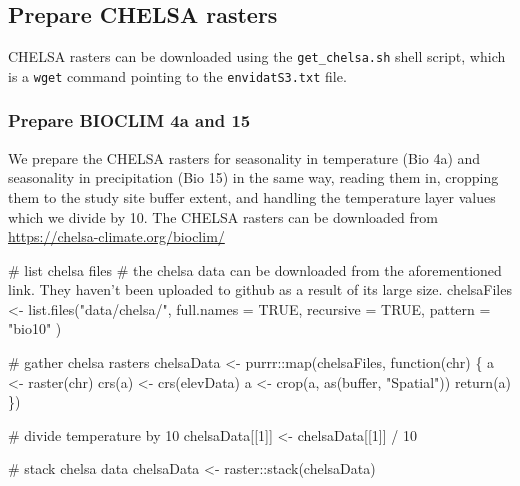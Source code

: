 \documentclass[
]{article}
\newenvironment{Shaded}{}{}
\newcommand{\CommentTok}[1]{\textcolor[rgb]{0.00,0.50,0.00}{#1}}
\newcommand{\ControlFlowTok}[1]{\textcolor[rgb]{0.00,0.00,1.00}{#1}}
\newcommand{\DataTypeTok}[1]{#1}
\newcommand{\DecValTok}[1]{#1}
\newcommand{\KeywordTok}[1]{\textcolor[rgb]{0.00,0.00,1.00}{#1}}
\newcommand{\NormalTok}[1]{#1}
\newcommand{\OperatorTok}[1]{#1}
\newcommand{\OtherTok}[1]{\textcolor[rgb]{1.00,0.25,0.00}{#1}}
\newcommand{\StringTok}[1]{\textcolor[rgb]{0.00,0.50,0.50}{#1}}
\begin{document}
\hypertarget{prepare-chelsa-rasters}{%
\subsection{Prepare CHELSA rasters}\label{prepare-chelsa-rasters}}

CHELSA rasters can be downloaded using the \texttt{get\_chelsa.sh} shell script, which is a \texttt{wget} command pointing to the \texttt{envidatS3.txt} file.

\hypertarget{prepare-bioclim-4a-and-15}{%
\subsubsection{Prepare BIOCLIM 4a and 15}\label{prepare-bioclim-4a-and-15}}

We prepare the CHELSA rasters for seasonality in temperature (Bio 4a) and seasonality in precipitation (Bio 15) in the same way, reading them in, cropping them to the study site buffer extent, and handling the temperature layer values which we divide by 10. The CHELSA rasters can be downloaded from \url{https://chelsa-climate.org/bioclim/}

\begin{Shaded}
\begin{Highlighting}[]
\CommentTok{# list chelsa files}
\CommentTok{# the chelsa data can be downloaded from the aforementioned link. They haven't been uploaded to github as a result of its large size.}
\NormalTok{chelsaFiles <-}\StringTok{ }\KeywordTok{list.files}\NormalTok{(}\StringTok{"data/chelsa/"}\NormalTok{,}
  \DataTypeTok{full.names =} \OtherTok{TRUE}\NormalTok{,}
  \DataTypeTok{recursive =} \OtherTok{TRUE}\NormalTok{,}
  \DataTypeTok{pattern =} \StringTok{"bio10"}
\NormalTok{)}

\CommentTok{# gather chelsa rasters}
\NormalTok{chelsaData <-}\StringTok{ }\NormalTok{purrr}\OperatorTok{::}\KeywordTok{map}\NormalTok{(chelsaFiles, }\ControlFlowTok{function}\NormalTok{(chr) \{}
\NormalTok{  a <-}\StringTok{ }\KeywordTok{raster}\NormalTok{(chr)}
  \KeywordTok{crs}\NormalTok{(a) <-}\StringTok{ }\KeywordTok{crs}\NormalTok{(elevData)}
\NormalTok{  a <-}\StringTok{ }\KeywordTok{crop}\NormalTok{(a, }\KeywordTok{as}\NormalTok{(buffer, }\StringTok{"Spatial"}\NormalTok{))}
  \KeywordTok{return}\NormalTok{(a)}
\NormalTok{\})}

\CommentTok{# divide temperature by 10}
\NormalTok{chelsaData[[}\DecValTok{1}\NormalTok{]] <-}\StringTok{ }\NormalTok{chelsaData[[}\DecValTok{1}\NormalTok{]] }\OperatorTok{/}\StringTok{ }\DecValTok{10}

\CommentTok{# stack chelsa data}
\NormalTok{chelsaData <-}\StringTok{ }\NormalTok{raster}\OperatorTok{::}\KeywordTok{stack}\NormalTok{(chelsaData)}
\end{Highlighting}
\end{Shaded}
\end{document}
